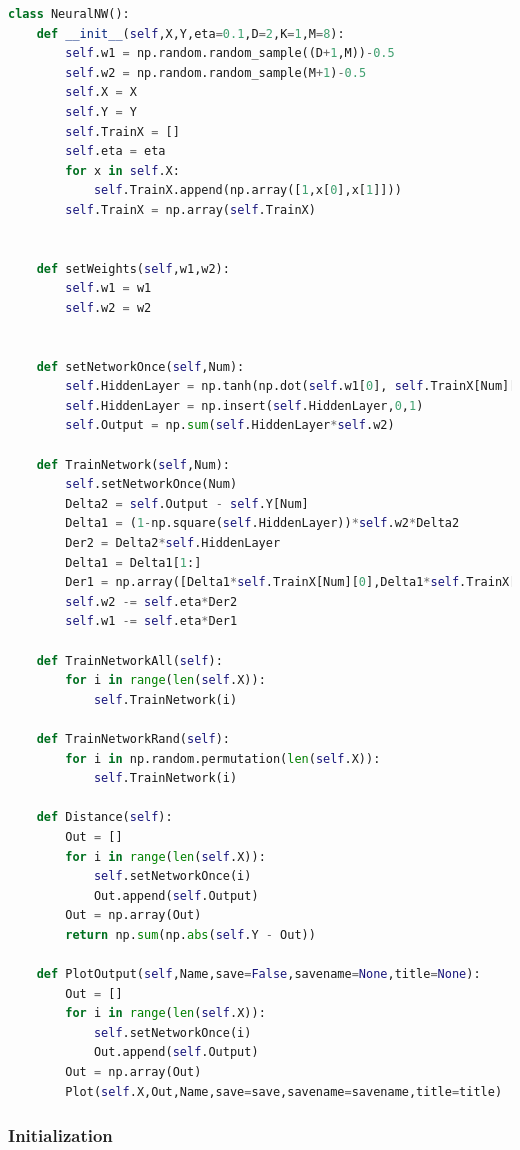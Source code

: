 \documentclass[a4paper]{article}
\begin{document}
\begin{lstlisting}[language=Python]
class NeuralNW():
    def __init__(self,X,Y,eta=0.1,D=2,K=1,M=8):
        self.w1 = np.random.random_sample((D+1,M))-0.5
        self.w2 = np.random.random_sample(M+1)-0.5
        self.X = X
        self.Y = Y
        self.TrainX = []
        self.eta = eta
        for x in self.X:
            self.TrainX.append(np.array([1,x[0],x[1]]))
        self.TrainX = np.array(self.TrainX)


    def setWeights(self,w1,w2):
        self.w1 = w1
        self.w2 = w2


    def setNetworkOnce(self,Num):
        self.HiddenLayer = np.tanh(np.dot(self.w1[0], self.TrainX[Num][0]) + np.dot(self.w1[1] , self.TrainX[Num][1]) + np.dot(self.w1[2],self.TrainX[Num][2]))
        self.HiddenLayer = np.insert(self.HiddenLayer,0,1)
        self.Output = np.sum(self.HiddenLayer*self.w2)

    def TrainNetwork(self,Num):
        self.setNetworkOnce(Num)
        Delta2 = self.Output - self.Y[Num]
        Delta1 = (1-np.square(self.HiddenLayer))*self.w2*Delta2
        Der2 = Delta2*self.HiddenLayer
        Delta1 = Delta1[1:]
        Der1 = np.array([Delta1*self.TrainX[Num][0],Delta1*self.TrainX[Num][1] , Delta1*self.TrainX[Num][2]])
        self.w2 -= self.eta*Der2
        self.w1 -= self.eta*Der1
        
    def TrainNetworkAll(self):
        for i in range(len(self.X)):
            self.TrainNetwork(i)
            
    def TrainNetworkRand(self):
        for i in np.random.permutation(len(self.X)):
            self.TrainNetwork(i)
    
    def Distance(self):
        Out = []
        for i in range(len(self.X)):
            self.setNetworkOnce(i)
            Out.append(self.Output)
        Out = np.array(Out)
        return np.sum(np.abs(self.Y - Out))
        
    def PlotOutput(self,Name,save=False,savename=None,title=None):
        Out = []
        for i in range(len(self.X)):
            self.setNetworkOnce(i)
            Out.append(self.Output)
        Out = np.array(Out)
        Plot(self.X,Out,Name,save=save,savename=savename,title=title)
\end{lstlisting}

\subsubsection*{Initialization}
\end{document}
